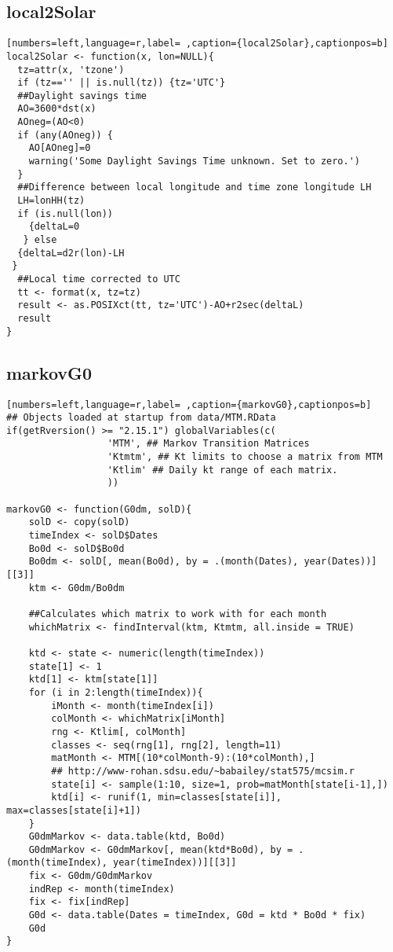 \subsection{local2Solar}
\label{sec:orga6e32e0}
\begin{lstlisting}[numbers=left,language=r,label= ,caption={local2Solar},captionpos=b]
local2Solar <- function(x, lon=NULL){	
  tz=attr(x, 'tzone')
  if (tz=='' || is.null(tz)) {tz='UTC'}
  ##Daylight savings time
  AO=3600*dst(x)
  AOneg=(AO<0)
  if (any(AOneg)) {
    AO[AOneg]=0
    warning('Some Daylight Savings Time unknown. Set to zero.')
  }
  ##Difference between local longitude and time zone longitude LH
  LH=lonHH(tz)
  if (is.null(lon)) 
    {deltaL=0
   } else
  {deltaL=d2r(lon)-LH
 }
  ##Local time corrected to UTC
  tt <- format(x, tz=tz)
  result <- as.POSIXct(tt, tz='UTC')-AO+r2sec(deltaL)
  result
}
\end{lstlisting}
\subsection{markovG0}
\label{sec:org78914f2}
\begin{lstlisting}[numbers=left,language=r,label= ,caption={markovG0},captionpos=b]
## Objects loaded at startup from data/MTM.RData
if(getRversion() >= "2.15.1") globalVariables(c(
                  'MTM', ## Markov Transition Matrices
                  'Ktmtm', ## Kt limits to choose a matrix from MTM
                  'Ktlim' ## Daily kt range of each matrix.
                  ))

markovG0 <- function(G0dm, solD){
    solD <- copy(solD)
    timeIndex <- solD$Dates
    Bo0d <- solD$Bo0d
    Bo0dm <- solD[, mean(Bo0d), by = .(month(Dates), year(Dates))][[3]]
    ktm <- G0dm/Bo0dm

    ##Calculates which matrix to work with for each month
    whichMatrix <- findInterval(ktm, Ktmtm, all.inside = TRUE)

    ktd <- state <- numeric(length(timeIndex))
    state[1] <- 1
    ktd[1] <- ktm[state[1]]
    for (i in 2:length(timeIndex)){
        iMonth <- month(timeIndex[i])
        colMonth <- whichMatrix[iMonth]
        rng <- Ktlim[, colMonth]
        classes <- seq(rng[1], rng[2], length=11)
        matMonth <- MTM[(10*colMonth-9):(10*colMonth),]
        ## http://www-rohan.sdsu.edu/~babailey/stat575/mcsim.r
        state[i] <- sample(1:10, size=1, prob=matMonth[state[i-1],])
        ktd[i] <- runif(1, min=classes[state[i]], max=classes[state[i]+1])
    }
    G0dmMarkov <- data.table(ktd, Bo0d)
    G0dmMarkov <- G0dmMarkov[, mean(ktd*Bo0d), by = .(month(timeIndex), year(timeIndex))][[3]]
    fix <- G0dm/G0dmMarkov
    indRep <- month(timeIndex)
    fix <- fix[indRep]
    G0d <- data.table(Dates = timeIndex, G0d = ktd * Bo0d * fix)
    G0d
}
\end{lstlisting}
